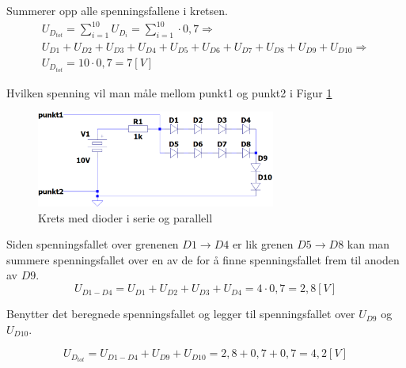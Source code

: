\vspace{0.5cm} %

\begin{solution}[name=Løsningsforslag oppgave]
	Summerer opp alle spenningsfallene i kretsen.
	\begin{multline*}
	U_{D_{tot}}=\sum_{i=1}^{10} U_{D_i}=\sum_{i=1}^{10}\cdot0,7 \Rightarrow \\	U_{D1}+U_{D2}+U_{D3}+U_{D4}+U_{D5}+U_{D6}+U_{D7}+U_{D8}+U_{D9}+U_{D10} \Rightarrow \\ U_{D_{tot}}=10\cdot0,7=7 [V]
	\end{multline*}
\end{solution}

\vspace{0.5cm} %


\begin{question}[name=Oppgave, topic=dioder]
Hvilken spenning vil man måle mellom punkt1 og punkt2 i Figur \ref{fig:DserieParaMix}
	
	\begin{figure}[H]
	\centering
	\includegraphics[width=0.7\textwidth]{diode/figurer/6serieOgParaD.png}
	\caption{Krets med dioder i serie og parallell}
	\label{fig:DserieParaMix}
	\end{figure}
	
	
\end{question}

\vspace{0.5cm} %

\begin{solution}[name=Løsningsforslag oppgave]
Siden spenningsfallet over grenenen $D1 \rightarrow D4$ er lik grenen $D5 \rightarrow D8$ kan man summere spenningsfallet over en av de for å finne spenningsfallet frem til anoden av $D9$.
\[U_{D1-D4}=U_{D1}+U_{D2}+U_{D3}+U_{D4}= 4\cdot0,7=2,8[V]\]

Benytter det beregnede spenningsfallet og legger til spenningsfallet over $U_{D9}$ og $U_{D10}$.

\[U_{D_{tot}}=U_{D1-D4}+U_{D9}+U_{D10}=2,8+0,7+0,7=4,2 [V]\]

\end{solution}

